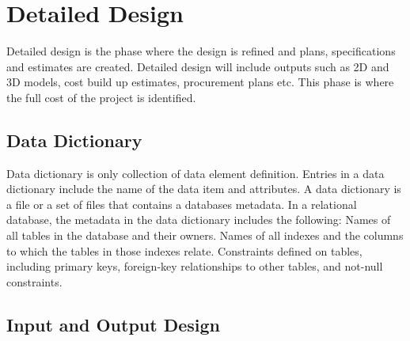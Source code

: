 \chapter{Detailed Design}

Detailed design is the phase where the design is refined and plans, specifications
and estimates are created. Detailed design will include outputs such as 2D and 3D
models, cost build up estimates, procurement plans etc. This phase is where the full
cost of the project is identified.

\section{Data Dictionary}
Data dictionary is only collection of data element definition. Entries in a data dictionary include the name of the data item and attributes. A data dictionary is a file or a set of files that contains a databases metadata. In a relational database, the metadata in the data dictionary includes the following: Names of all tables in the database and their owners. Names of all indexes and the columns to which the tables in those indexes relate. Constraints defined on tables, including primary keys, foreign-key relationships to other tables, and not-null constraints.


        


		
		
\section{Input and Output Design}

